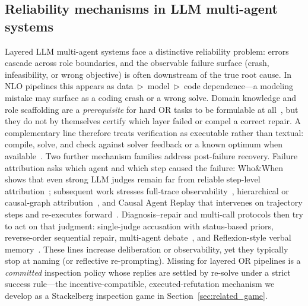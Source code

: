 \documentclass[a4paper,fleqn]{cas-sc}
\newcommand{\tri}{\triangleright}
\begin{document}
\subsection{Reliability mechanisms in LLM multi-agent systems}
\label{sec:related_reliability}
Layered LLM multi-agent systems face a distinctive reliability problem:
errors cascade across role boundaries, and the observable failure surface
(crash, infeasibility, or wrong objective) is often downstream of the true
root cause. In NLO pipelines this appears as data~$\tri$~model~$\tri$~code
dependence---a modeling mistake may surface as a coding crash or a wrong
solve. Domain knowledge and role scaffolding are a \emph{prerequisite} for
hard OR tasks to be formulable at
all~\citep{wu2024autogen,xiao2023coe,ahmaditeshnizi2024optimus}, but they do
not by themselves certify which layer failed or compel a correct repair. A
complementary line therefore treats verification as executable rather than
textual: compile, solve, and check against solver feedback or a known
optimum when
available~\citep{ahmaditeshnizi2024optimus,ahmaditeshnizi2024optimus03}.
Two further mechanism families address post-failure recovery. Failure
attribution asks which agent and which step caused the failure: Who\&When
shows that even strong LLM judges remain far from reliable step-level
attribution~\citep{zhang2025whowhen}; subsequent work stresses full-trace
observability~\citep{chen2026traceelephant}, hierarchical or causal-graph
attribution~\citep{wang2026chief}, and Causal Agent Replay that intervenes
on trajectory steps and re-executes forward~\citep{shah2026car}.
Diagnosis--repair and multi-call protocols then try to act on that judgment:
single-judge accusation with status-based priors, reverse-order sequential
repair, multi-agent debate~\citep{du2023improving,liang2024mad}, and
Reflexion-style verbal memory~\citep{shinn2023reflexion}. These lines
increase deliberation or observability, yet they typically stop at naming
(or reflective re-prompting). Missing for layered OR pipelines is a
\emph{committed} inspection policy whose replies are settled by re-solve
under a strict success rule---the incentive-compatible, executed-refutation
mechanism we develop as a Stackelberg inspection game in
Section~\ref{sec:related_game}.
\end{document}
